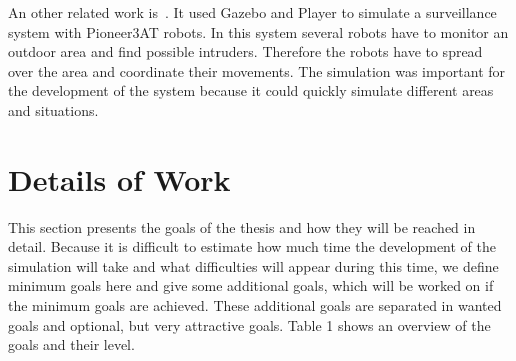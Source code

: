 \documentclass[11pt,a4paper,titlepage]{article}
\begin{document}
An other related work is~\cite{SurveillanceSystem}. It used Gazebo and Player to simulate a surveillance system with Pioneer3AT robots. In this system several robots have to monitor an outdoor area and find possible intruders. Therefore the robots have to spread over the area and coordinate their movements. The simulation was important for the development of the system because it could quickly simulate different areas and situations.

\section{Details of Work}
This section presents the goals of the thesis and how they will be reached in detail. Because it is difficult to estimate how much time the development of the simulation will take and what difficulties will appear during this time, we define minimum goals here and give some additional goals, which will be worked on if the minimum goals are achieved. These additional goals are separated in wanted goals and optional, but very attractive goals. Table 1 shows an overview of the goals and their level.
\end{document}
